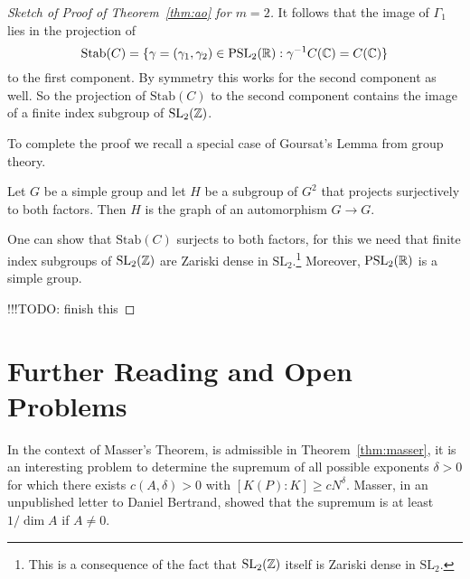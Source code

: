\begin{proof}[Sketch of Proof of Theorem~\ref{thm:ao} for $m=2$]
  It follows that the image of
  $\Gamma_1$ lies in the projection of
  \begin{equation*}
    \mathrm{Stab}(C) = \{\gamma= (\gamma_1,\gamma_2) \in \mathrm{PSL}_2({\mathbb{R}}) :
    \gamma^{-1}C({\mathbb{C}}) = C({\mathbb{C}}) \}
  \end{equation*}
  to the first component. 
  By symmetry this works for the second component as well. So the
  projection of $\mathrm{Stab}(C)$ to the second component contains 
  the image of a finite index subgroup of $\mathrm{SL}_2({\mathbb{Z}})$.
  
  To complete the proof we recall a special case of Goursat's Lemma
  from group theory.

  \begin{lemma}
    Let $G$ be a simple group and let $H$ be a subgroup of $G^2$ that
    projects surjectively to both factors. Then $H$ is the graph of an
    automorphism $G\rightarrow G$. 
  \end{lemma}

  One can show that $\mathrm{Stab}(C)$ surjects to both factors, for
  this we need that finite index subgroups of $\mathrm{SL}_2({\mathbb{Z}})$ are
  Zariski dense in $\mathrm{SL}_2$.\footnote{This is a
    consequence of the fact that $\mathrm{SL}_2({\mathbb{Z}})$ itself is
    Zariski dense in $\mathrm{SL}_2$.}  Moreover, $\mathrm{PSL}_2({\mathbb{R}})$ is
  a simple group.

  !!!TODO: finish this
\end{proof}
\section{Further Reading and Open Problems}

In the context of Masser's Theorem, is admissible in
Theorem~\ref{thm:masser}, it is an interesting problem to determine
the supremum of all possible exponents $\delta>0$ for which there
exists $c(A,\delta)>0$ with $[K(P):K]\ge c N^{\delta}$. Masser, in an
unpublished letter to Daniel Bertrand, showed that the supremum is at
least $1/\dim A$ if $A\not=0$. 


